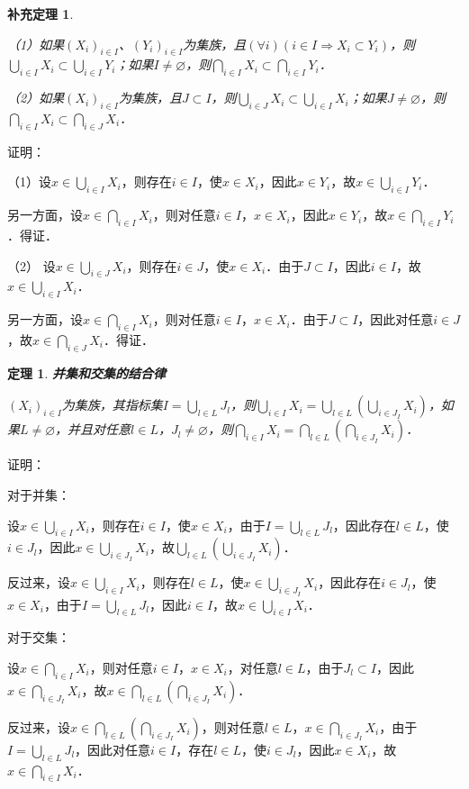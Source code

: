 \documentclass[12pt, a4paper, oneside]{book}
\newtheorem{theo}{定理}
\newtheorem{cor}{补充定理}
\begin{document}
			\begin{cor}\label{cor97}
				\hfill\par
				（1）如果$(X_i)_{i\in I}$、$(Y_i)_{i\in I}$为集族，且$(\forall i)(i\in I\Rightarrow X_i\subset Y_i)$，则$\bigcup\limits_{i\in I}X_i\subset \bigcup\limits_{i\in I}Y_i$；如果$I\neq \varnothing$，则$\bigcap\limits_{i\in I}X_i\subset \bigcap\limits_{i\in I}Y_i$．
				\par
				（2）如果$(X_i)_{i\in I}$为集族，且$J\subset I$，则$\bigcup\limits_{i\in J}X_i\subset \bigcup\limits_{i\in I}X_i$；如果$J\neq \varnothing$，则$\bigcap\limits_{i\in I}X_i\subset \bigcap\limits_{i\in J}X_i$．
			\end{cor}
			证明：
			\par
			（1）设$x\in \bigcup\limits_{i\in I}X_i$，则存在$i\in I$，使$x\in X_i$，因此$x\in Y_i$，故$x\in \bigcup\limits_{i\in I}Y_i$．
			\par
			另一方面，设$x\in \bigcap\limits_{i\in I}X_i$，则对任意$i\in I$，$x\in X_i$，因此$x\in Y_i$，故$x\in \bigcap\limits_{i\in I}Y_i$．得证．
			\par
			（2）	设$x\in \bigcup\limits_{i\in J}X_i$，则存在$i\in J$，使$x\in X_i$．由于$J\subset I$，因此$i\in I$，故$x\in \bigcup\limits_{i\in I}X_i$．
			\par
			另一方面，设$x\in \bigcap\limits_{i\in I}X_i$，则对任意$i\in I$，$x\in X_i$．由于$J\subset I$，因此对任意$i\in J$，故$x\in \bigcap\limits_{i\in J}X_i$．得证．
			
			\begin{theo}
				\textbf{并集和交集的结合律}\label{theo25}
				\par
				$(X_i)_{i\in I}$为集族，其指标集$I=\bigcup\limits_{l\in L}J_l$，则$\bigcup\limits_{i\in I}X_i=\bigcup\limits_{l\in L}(\bigcup\limits_{i\in J_I}X_i)$，如果$L\neq \varnothing$，并且对任意$l\in L$，$J_l\neq \varnothing$，则$\bigcap\limits_{i\in I}X_i=\bigcap\limits_{l\in L}(\bigcap\limits_{i\in J_I}X_i)$．
			\end{theo}
			证明：
			\par
			对于并集：
			\par
			设$x\in \bigcup\limits_{i\in I}X_i$，则存在$i\in I$，使$x\in X_i$，由于$I=\bigcup\limits_{l\in L}J_l$，因此存在$l\in L$，使$i\in J_l$，因此$x\in \bigcup\limits_{i\in J_I}X_i$，故$\bigcup\limits_{l\in L}(\bigcup\limits_{i\in J_I}X_i)$．
			\par
			反过来，设$x\in \bigcup\limits_{i\in I}X_i$，则存在$l\in L$，使$x\in \bigcup\limits_{i\in J_I}X_i$，因此存在$i\in J_l$，使$x\in X_i$，由于$I=\bigcup\limits_{l\in L}J_l$，因此$i\in I$，故$x\in \bigcup\limits_{i\in I}X_i$．
			\par
			对于交集：
			\par
			设$x\in \bigcap\limits_{i\in I}X_i$，则对任意$i\in I$，$x\in X_i$，对任意$l\in L$，由于$J_l\subset I$，因此$x\in \bigcap\limits_{i\in J_I}X_i$，故$x\in \bigcap\limits_{l\in L}(\bigcap\limits_{i\in J_I}X_i)$．
			\par
			反过来，设$x\in \bigcap\limits_{l\in L}(\bigcap\limits_{i\in J_I}X_i)$，则对任意$l\in L$，$x\in \bigcap\limits_{i\in J_I}X_i$，由于$I=\bigcup\limits_{l\in L}J_l$，因此对任意$i\in I$，存在$l\in L$，使$i\in J_l$，因此$x\in X_i$，故$x\in \bigcap\limits_{i\in I}X_i$．
			
\end{document}

